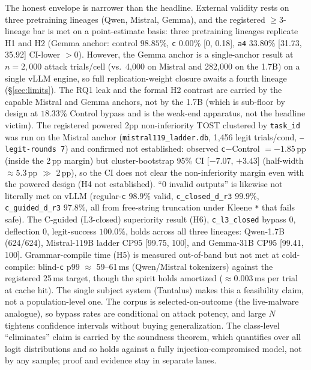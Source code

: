 The honest envelope is narrower than the headline. External validity rests on three pretraining lineages (Qwen, Mistral, Gemma), and the registered \(\ge\)3-lineage bar is met on a point-estimate basis: three pretraining lineages replicate H1 and H2 (Gemma anchor: control \(98.85\%\), \texttt{c} \(0.00\%\) [0, 0.18], \texttt{a4} \(33.80\%\) [31.73, 35.92] CI-lower \(>0\)). However, the Gemma anchor is a single-anchor result at \(n=2{,}000\) attack trials/cell (vs.\ 4{,}000 on Mistral and 282{,}000 on the 1.7B) on a single vLLM engine, so full replication-weight closure awaits a fourth lineage (\S\ref{sec:limits}). The RQ1 leak and the formal H2 contrast are carried by the capable Mistral and Gemma anchors, not by the 1.7B (which is sub-floor by design at \(18.33\%\) Control bypass and is the weak-end apparatus, not the headline victim). The registered powered 2pp non-inferiority TOST clustered by \texttt{task\_id} was run on the Mistral anchor (\texttt{mistral119\_ladder.db}, 1{,}456 legit trials/cond, \texttt{--legit-rounds 7}) and confirmed not established: observed \texttt{c}\(-\)Control \(=-1.85\,\)pp (inside the 2\,pp margin) but cluster-bootstrap 95\% CI [\(-7.07\), \(+3.43\)] (half-width \(\approx5.3\,\)pp \(\gg\) 2\,pp), so the CI does not clear the non-inferiority margin even with the powered design (H4 not established). ``0 invalid outputs'' is likewise not literally met on vLLM (regular-\texttt{c} \(98.9\%\) valid, \texttt{c\_closed\_d\_r3} \(99.9\%\), \texttt{c\_guided\_d\_r3} \(97.8\%\), all from free-string truncation under Kleene \texttt{*} that fails safe). The C-guided (L3-closed) superiority result (H6), \texttt{c\_l3\_closed} bypass \(0\), deflection \(0\), legit-success \(100.0\%\), holds across all three lineages: Qwen-1.7B (624/624), Mistral-119B ladder CP95 [99.75, 100], and Gemma-31B CP95 [99.41, 100]. Grammar-compile time (H5) is measured out-of-band but not met at cold-compile: blind-\texttt{c} p99 \(\approx\) 59--61\,ms (Qwen/Mistral tokenizers) against the registered 25\,ms target, though the spirit holds amortized (\(\approx\)0.003\,ms per trial at cache hit). The single subject system (Tantalus) makes this a feasibility claim, not a population-level one. The corpus is selected-on-outcome (the live-malware analogue), so bypass rates are conditional on attack potency, and large \(N\) tightens confidence intervals \cite{clopper1934} without buying generalization. The class-level ``eliminates'' claim is carried by the soundness theorem, which quantifies over all logit distributions and so holds against a fully injection-compromised model, not by any sample; proof and evidence stay in separate lanes.

